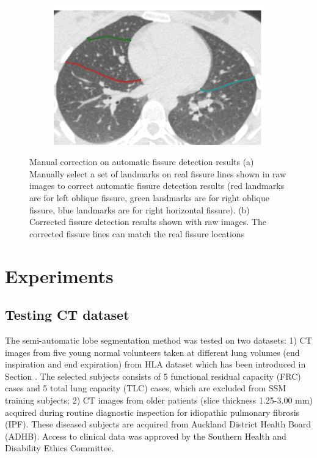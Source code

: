 {\begin{figure}[htbp]
\begin{subfigure}{.49\linewidth}
  \includegraphics[width=\linewidth,trim={{.0\wd0} {.0\wd0} {.0\wd0} {.0\wd0}},clip]{Segmentation/Image/AfterManualCorrection.png}
  \caption{}
  \label{fig:ManualCorrection-b} 
\end{subfigure}
\caption{Manual correction on automatic fissure detection results (a) Manually select a set of landmarks on real fissure lines shown in raw images to correct automatic fissure detection results (red landmarks are for left oblique fissure, green landmarks are for right oblique fissure, blue landmarks are for right horizontal fissure). (b) Corrected fissure detection results shown with raw images. The corrected fissure lines can match the real fissure locations}
\label{fig:ManualCorrection}
\end{figure}

\section{Experiments} \label{SegmentationExperiment}

\subsection{Testing CT dataset}
The semi-automatic lobe segmentation method was tested on two datasets: 1) CT images from five young normal volunteers taken at different lung volumes (end inspiration and end expiration) from HLA dataset which has been introduced in Section \label{ShapeModelGeneration}. The selected subjects consists of 5 functional residual capacity (FRC) cases and 5 total lung capacity (TLC) cases, which are excluded from SSM training subjects; 2) CT images from older patients (slice thickness 1.25-3.00 mm) acquired during routine diagnostic inspection for idiopathic pulmonary fibrosis (IPF). These diseased subjects are acquired from Auckland District Health Board (ADHB). Access to clinical data was approved by the Southern Health and Disability Ethics Committee. 

}
